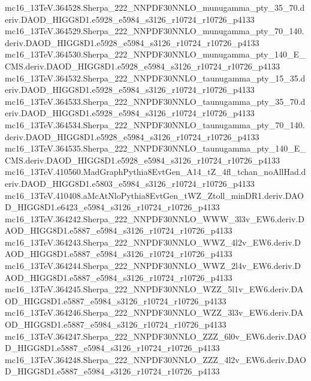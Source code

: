 \begin{footnotesize}
mc16\_13TeV.364528.Sherpa\_222\_NNPDF30NNLO\_munugamma\_pty\_35\_70.deriv.DAOD\_HIGG8D1.e5928\_e5984\_s3126\_r10724\_r10726\_p4133 \\
mc16\_13TeV.364529.Sherpa\_222\_NNPDF30NNLO\_munugamma\_pty\_70\_140.deriv.DAOD\_HIGG8D1.e5928\_e5984\_s3126\_r10724\_r10726\_p4133 \\
mc16\_13TeV.364530.Sherpa\_222\_NNPDF30NNLO\_munugamma\_pty\_140\_E\_CMS.deriv.DAOD\_HIGG8D1.e5928\_e5984\_s3126\_r10724\_r10726\_p4133 \\
mc16\_13TeV.364532.Sherpa\_222\_NNPDF30NNLO\_taunugamma\_pty\_15\_35.deriv.DAOD\_HIGG8D1.e5928\_e5984\_s3126\_r10724\_r10726\_p4133 \\
mc16\_13TeV.364533.Sherpa\_222\_NNPDF30NNLO\_taunugamma\_pty\_35\_70.deriv.DAOD\_HIGG8D1.e5928\_e5984\_s3126\_r10724\_r10726\_p4133 \\
mc16\_13TeV.364534.Sherpa\_222\_NNPDF30NNLO\_taunugamma\_pty\_70\_140.deriv.DAOD\_HIGG8D1.e5928\_e5984\_s3126\_r10724\_r10726\_p4133 \\
mc16\_13TeV.364535.Sherpa\_222\_NNPDF30NNLO\_taunugamma\_pty\_140\_E\_CMS.deriv.DAOD\_HIGG8D1.e5928\_e5984\_s3126\_r10724\_r10726\_p4133 \\
mc16\_13TeV.410560.MadGraphPythia8EvtGen\_A14\_tZ\_4fl\_tchan\_noAllHad.deriv.DAOD\_HIGG8D1.e5803\_e5984\_s3126\_r10724\_r10726\_p4133 \\
mc16\_13TeV.410408.aMcAtNloPythia8EvtGen\_tWZ\_Ztoll\_minDR1.deriv.DAOD\_HIGG8D1.e6423\_e5984\_s3126\_r10724\_r10726\_p4133 \\
mc16\_13TeV.364242.Sherpa\_222\_NNPDF30NNLO\_WWW\_3l3v\_EW6.deriv.DAOD\_HIGG8D1.e5887\_e5984\_s3126\_r10724\_r10726\_p4133 \\
mc16\_13TeV.364243.Sherpa\_222\_NNPDF30NNLO\_WWZ\_4l2v\_EW6.deriv.DAOD\_HIGG8D1.e5887\_e5984\_s3126\_r10724\_r10726\_p4133 \\
mc16\_13TeV.364244.Sherpa\_222\_NNPDF30NNLO\_WWZ\_2l4v\_EW6.deriv.DAOD\_HIGG8D1.e5887\_e5984\_s3126\_r10724\_r10726\_p4133 \\
mc16\_13TeV.364245.Sherpa\_222\_NNPDF30NNLO\_WZZ\_5l1v\_EW6.deriv.DAOD\_HIGG8D1.e5887\_e5984\_s3126\_r10724\_r10726\_p4133 \\
mc16\_13TeV.364246.Sherpa\_222\_NNPDF30NNLO\_WZZ\_3l3v\_EW6.deriv.DAOD\_HIGG8D1.e5887\_e5984\_s3126\_r10724\_r10726\_p4133 \\
mc16\_13TeV.364247.Sherpa\_222\_NNPDF30NNLO\_ZZZ\_6l0v\_EW6.deriv.DAOD\_HIGG8D1.e5887\_e5984\_s3126\_r10724\_r10726\_p4133 \\
mc16\_13TeV.364248.Sherpa\_222\_NNPDF30NNLO\_ZZZ\_4l2v\_EW6.deriv.DAOD\_HIGG8D1.e5887\_e5984\_s3126\_r10724\_r10726\_p4133 \\

\end{footnotesize}
